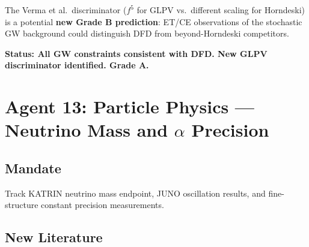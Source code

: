 \documentclass[11pt,a4paper]{article}
\begin{document}
The Verma et al.\ discriminator ($f^5$ for GLPV vs.\ different scaling for Horndeski) is a potential \textbf{new Grade B prediction}: ET/CE observations of the stochastic GW background could distinguish DFD from beyond-Horndeski competitors.

\textbf{Status: All GW constraints consistent with DFD. New GLPV discriminator identified. Grade A.}

\section{Agent 13: Particle Physics --- Neutrino Mass and $\alpha$ Precision}

\subsection{Mandate}
Track KATRIN neutrino mass endpoint, JUNO oscillation results, and fine-structure constant precision measurements.

\subsection{New Literature}
\end{document}
